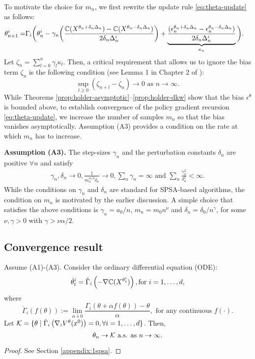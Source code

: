\documentclass[11pt,letterpaper,english]{article}
\begin{document}
To motivate the choice for $m_n$, we first rewrite the update rule \eqref{eq:theta-update} as follows:
\begin{align*}
\theta^{i}_{n+1}  = & \Gamma_{i}\bigg( \theta^{i}_n -  \gamma_n \bigg( \frac{\mathbb{C}(X^{\theta_n +\delta_n\Delta_n}) - \mathbb{C}(X^{\theta_n-\delta_n\Delta_n})}{2\delta_n\Delta_n^{i}}\bigg) + \underbrace{\frac{(\epsilon_n^{\theta_n +\delta_n\Delta_n} - \epsilon_n^{\theta_n-\delta_n\Delta_n})}{2\delta_n\Delta_n^{i}}}_{\kappa_n}\bigg).
\end{align*}
Let $\zeta_n = \sum_{l = 0}^{n} \gamma_l \kappa_{l}$. Then, a critical requirement that allows us to ignore the bias term $\zeta_n$ is the following condition (see Lemma 1 in Chapter 2 of \cite{borkar2008stochastic}): 
$$\sup_{l\ge0} \left (\zeta_{n+l} - \zeta_n \right) \rightarrow 0 \text{ as } n\rightarrow\infty.$$ 
While Theorems \ref{prop:holder-asymptotic}--\ref{prop:holder-dkw} show that the bias $\epsilon^\theta$ is bounded above, to establish convergence of the policy gradient recursion \eqref{eq:theta-update}, we increase the number of samples $m_n$ so that the bias vanishes asymptotically.  Assumption (A3) provides a condition on the rate at which $m_n$ has to increase.

\noindent\textbf{Assumption (A3).}  The step-sizes $\gamma_n$ and the perturbation constants 
$\delta_n$ are positive $\forall n$ and satisfy
\begin{align*}
\gamma_n, \delta_n \rightarrow 0, \frac{1}{m_n^{\alpha/2}\delta_n}\rightarrow 0,  \sum_n \gamma_n=\infty \text{ and } \sum_n \frac{\gamma_n^2}{\delta_n^2}<\infty. 
\end{align*}
While the conditions on $\gamma_n$ and $\delta_n$ are standard for SPSA-based algorithms, the condition on $m_n$ is motivated by the earlier discussion. 
A simple choice that satisfies the above conditions is $\gamma_n = a_0/n$, $m_n = m_0 n^\nu$ and $\delta_n = \delta_0/{n^\gamma}$, for some $\nu, \gamma >0$ with $\gamma > \nu\alpha/2$.

\subsection{Convergence result}
\begin{theorem}
\label{thm:1spsa-conv}
Assume (A1)-(A3).
Consider the  ordinary differential equation (ODE): 
$$\dot\theta^{i}_t = \check\Gamma_{i}\left(- \nabla \mathbb{C}(X^{\theta^{i}_t})\right), \text{for }i=1,\dots,d,$$ 
where 
$$\check\Gamma_{i}(f(\theta)) := \lim\limits_{\alpha \downarrow 0} \frac{\Gamma_{i}(\theta + \alpha f(\theta)) - \theta}{\alpha}, \textrm{ for any continuous }f(\cdot).$$
 Let $\mathcal{K} = \{\theta \mid \check\Gamma_{i} \left(\nabla_i V^{\theta}(x^0)\right)=0, \forall i=1,\ldots,d\}$. Then,
$$\theta_n \rightarrow \mathcal{K} \text{ a.s. as } n\rightarrow \infty.$$
\end{theorem}
\begin{proof}
 See Section \ref{appendix:1spsa}.
\end{proof}
\end{document}
